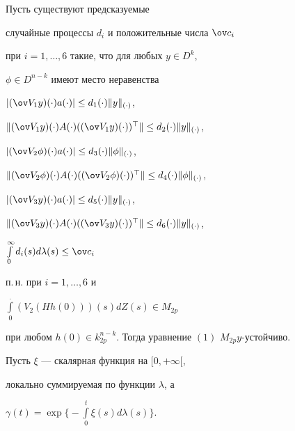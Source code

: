 \begin{thm}


Пусть существуют предсказуемые 


случайные процессы $d_i$ и положительные числа $\ov c_i$ 


при $i = 1,\dotsc, 6$ такие, что для любых $y \in D^k$, 


$\phi \in D^{n-k}$ имеют место неравенства 


$|(\ov V_1y)(\cdot)a(\cdot)| \le d_1(\cdot)\|y\|_{(\cdot)}$,


$\|(\ov V_1y)(\cdot)A(\cdot)((\ov V_1y)(\cdot))^\top\|


\le d_2(\cdot)\|y\|_{(\cdot)}$,


$|(\ov V_2\phi )(\cdot)a(\cdot)| \le d_3(\cdot)\|\phi\|_{(\cdot)}$,


$\|(\ov V_2\phi )(\cdot)A(\cdot)((\ov V_2\phi )(\cdot))^\top\|


\le d_4(\cdot)\|\phi \|_{(\cdot)}$,


$|(\ov V_3y)(\cdot)a(\cdot)| \le d_5(\cdot)\|y\|_{(\cdot)}$,


$\|(\ov V_3y)(\cdot)A(\cdot)((\ov V_3y)(\cdot))^\top\|


\le d_6(\cdot)\|y\|_{(\cdot)}$, 


$\int \limits_0^\infty d_i(s)d\lambda (s) \le \ov c_i$ 


п.\,н. при $i = 1,\dotsc, 6$ и


$\int \limits_0^{\displaystyle .}(V_2(Hh(0)))(s)dZ(s) \in M_{2p}$ 


при любом $h(0) \in k_{2p}^{n-k}$. Тогда уравнение $(1)$ $M_{2p}y$-устойчиво.


\end{thm}





Пусть $\xi $ --- скалярная функция на $[0, +\infty [$, 


локально суммируемая по функции $\lambda $, а 


$\gamma (t) = \exp \Big\{-\int \limits_0^t\xi (s)d\lambda (s)\Big\}$. 





